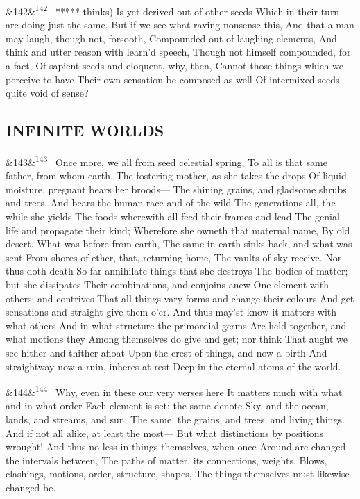 \documentclass[12pt]{article}
\newcommand{\para}[1][]{\par\noindent\ifx&#1&\else\textsuperscript{\footnotesize #1}~\fi}
\begin{document}
\para[142] ***** thinks) Is yet derived out of other seeds Which in their turn are doing just the same. But if we see what raving nonsense this, And that a man may laugh, though not, forsooth, Compounded out of laughing elements, And think and utter reason with learn'd speech, Though not himself compounded, for a fact, Of sapient seeds and eloquent, why, then, Cannot those things which we perceive to have Their own sensation be composed as well Of intermixed seeds quite void of sense?

\subsection*{INFINITE WORLDS}

\para[143] Once more, we all from seed celestial spring, To all is that same father, from whom earth, The fostering mother, as she takes the drops Of liquid moisture, pregnant bears her broods--- The shining grains, and gladsome shrubs and trees, And bears the human race and of the wild The generations all, the while she yields The foods wherewith all feed their frames and lead The genial life and propagate their kind; Wherefore she owneth that maternal name, By old desert. What was before from earth, The same in earth sinks back, and what was sent From shores of ether, that, returning home, The vaults of sky receive. Nor thus doth death So far annihilate things that she destroys The bodies of matter; but she dissipates Their combinations, and conjoins anew One element with others; and contrives That all things vary forms and change their colours And get sensations and straight give them o'er. And thus may'st know it matters with what others And in what structure the primordial germs Are held together, and what motions they Among themselves do give and get; nor think That aught we see hither and thither afloat Upon the crest of things, and now a birth And straightway now a ruin, inheres at rest Deep in the eternal atoms of the world.

\para[144] Why, even in these our very verses here It matters much with what and in what order Each element is set: the same denote Sky, and the ocean, lands, and streams, and sun; The same, the grains, and trees, and living things. And if not all alike, at least the most--- But what distinctions by positions wrought! And thus no less in things themselves, when once Around are changed the intervals between, The paths of matter, its connections, weights, Blows, clashings, motions, order, structure, shapes, The things themselves must likewise changed be.
\end{document}
